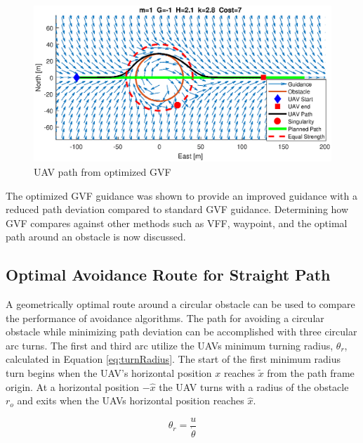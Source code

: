 \documentclass[numbered,pdftex]{ohio-etd}
\begin{document}
\begin{figure}[H]
	\centering
	\includegraphics[trim=0 85 0 85,clip,width=15cmm]{PaperFigures/Methods/solvedN1V10}
	\caption{UAV path from optimized GVF}
	\label{fig:optimizedPath}
\end{figure}

The optimized GVF guidance was shown to provide an improved guidance with a reduced path deviation compared to standard GVF guidance. Determining how GVF compares against other methods such as VFF, waypoint, and the optimal path around an obstacle is now discussed. 




\subsection{Optimal Avoidance Route for Straight Path}
A geometrically optimal route around a circular obstacle can be used to compare the performance of avoidance algorithms. The path for avoiding a circular obstacle while minimizing path deviation can be accomplished with three circular arc turns. The first and third arc utilize the UAVs minimum turning radius, $\theta_r$, calculated in Equation \ref{eq:turnRadius}. The start of the first minimum radius turn begins when the UAV's horizontal position $x$ reaches  $\tilde{x}$ from the path frame origin. At a horizontal position $-\hat{x}$ the UAV turns with a radius of the obstacle $r_o$ and exits when the UAVs horizontal position reaches $\hat{x}$. 

\begin{equation}
\label{eq:turnRadius}
\theta_r = \frac{u}{\dot{\theta}}
\end{equation}
\end{document}
